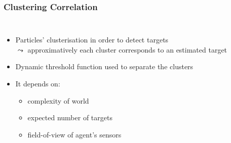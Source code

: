 \begin{frame}
	\frametitle{Clustering Correlation}
	\begin{columns}[T]
		\centering
		\begin{itemize}
			\item Particles' clusterisation in order to detect targets \\
				  $ \leadsto $ approximatively each cluster corresponds to an estimated target
			\item Dynamic threshold function used to separate the clusters
			\item It depends on:
			
			\begin{itemize}
				\item complexity of world
				\item expected number of targets
				\item field-of-view of agent's sensors
			\end{itemize}
		\end{itemize}
		
		\centering
		
		\\
		\vspace{0.2cm}
	\end{columns}
\end{frame}
